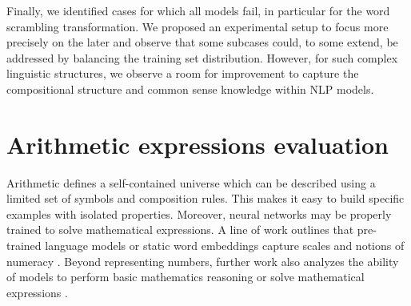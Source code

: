 Finally, we identified cases for which all models fail, in particular for the word scrambling transformation. We proposed an experimental setup to focus more precisely on the later and observe that some subcases could, to some extend, be addressed by balancing the training set distribution. However, for such complex linguistic structures, we observe a room for improvement to capture the compositional structure and common sense knowledge within NLP models.



\section{Arithmetic expressions evaluation}




Arithmetic defines a self-contained universe which can be described using a limited set of symbols and composition rules. This makes it easy to build specific examples with isolated properties. Moreover, neural networks may be properly trained to solve mathematical expressions. A line of work outlines that pre-trained language models or static word embeddings capture scales and notions of numeracy \parencite{wallace_19, naik_19, sundararaman_20, zhang_20, thawani_21}. Beyond representing numbers, further work also analyzes the ability of models to perform basic mathematics reasoning \parencite{saxton_19, dua_19, geva_20} or solve mathematical expressions \parencite{lample_20}.

